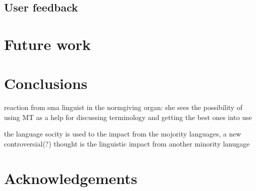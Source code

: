 \documentclass[a4paper,11pt,twocolumn]{article}
\begin{document}
\subsection{User feedback}

\section{Future work}
\section{Conclusions}

 reaction from sma linguist in the normgiving organ: she sees the possibility of using MT as a help for discussing terminology and getting the best ones into use

 the language socity is used to the impact from the mojority languages, a new controversial(?) thought is the linguistic impact from another minority lanugage 


\section*{Acknowledgements}



\end{document}
